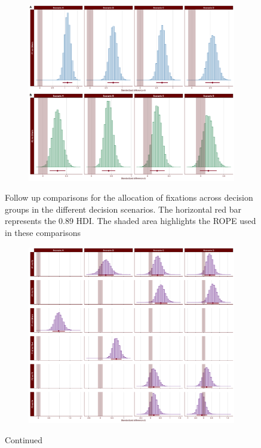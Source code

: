 \documentclass[
  english,
  man]{apa6}
\begin{document}
\begin{appendix}
\begin{figure}[!b]
\centering
\begin{subfigure}{1\textwidth}
\includegraphics[width=\linewidth]{Figures/SD2_proportion_scenario_comparisons_A.png}
\label{fig:proportion-scenario-comparisons-A}
\end{subfigure}
\caption[]{Follow up comparisons for the allocation of fixations across decision groups in the different decision scenarios. The horizontal red bar represents the 0.89 HDI. The shaded area highlights the ROPE used in these comparisons}
\end{figure}

\medskip

\begin{figure}[ht]\ContinuedFloat
\centering
\begin{subfigure}{1\textwidth}
\includegraphics[width=\linewidth]{Figures/SD2_proportion_scenario_comparisons_B.png}
\label{fig:proportion-scenario-comparisons-B}
\end{subfigure}
\caption[]{Continued}
\end{figure}


\end{appendix}
\end{document}
